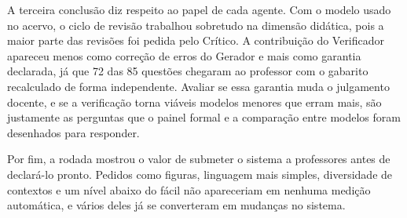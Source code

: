 A terceira conclusão diz respeito ao papel de cada agente. Com o modelo usado no acervo, o ciclo de
revisão trabalhou sobretudo na dimensão didática, pois a maior parte das revisões foi pedida pelo
Crítico. A contribuição do Verificador apareceu menos como correção de erros do Gerador e mais como
garantia declarada, já que 72 das 85 questões chegaram ao professor com o gabarito recalculado de
forma independente. Avaliar se essa garantia muda o julgamento docente, e se a verificação torna
viáveis modelos menores que erram mais, são justamente as perguntas que o painel formal e a
comparação entre modelos foram desenhados para responder.

Por fim, a rodada mostrou o valor de submeter o sistema a professores antes de declará-lo pronto.
Pedidos como figuras, linguagem mais simples, diversidade de contextos e um nível abaixo do fácil não
apareceriam em nenhuma medição automática, e vários deles já se converteram em mudanças no sistema.

